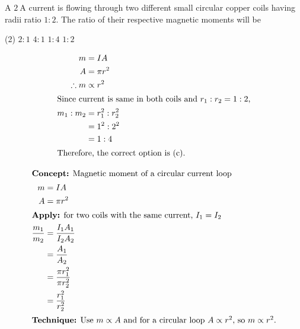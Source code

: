 

\item A $2 \ \mathrm{A}$ current is flowing through two different small circular copper coils having radii ratio $1 : 2$. The ratio of their respective magnetic moments will be
\begin{tasks}(2)
    \task $2 : 1$
    \task $4 : 1$
    \task $1 : 4$ \ans
    \task $1 : 2$
\end{tasks}
\begin{solution}
    \begin{align*}
    m &= I A\\
    A &= \pi r^2\\
    \therefore m &\propto r^2\\
    \intertext{Since current is same in both coils and $r_1 : r_2 = 1 : 2$,}
    m_1 : m_2 &= r_1^2 : r_2^2\\
    &= 1^2 : 2^2\\
    &= 1 : 4\\
    \intertext{Therefore, the correct option is (c).}
    \end{align*}
\end{solution}

\begin{idea}
    \begin{align*}
    \intertext{\textbf{Concept:} Magnetic moment of a circular current loop}
    m &= IA \\
    A &= \pi r^2 \\
    \intertext{\textbf{Apply:} for two coils with the same current, $I_1=I_2$}
    \frac{m_1}{m_2} &= \frac{I_1A_1}{I_2A_2} \\
    &= \frac{A_1}{A_2} \\
    &= \frac{\pi r_1^2}{\pi r_2^2} \\
    &= \frac{r_1^2}{r_2^2} \\
    \intertext{\textbf{Technique:} Use $m \propto A$ and for a circular loop $A \propto r^2$, so $m \propto r^2$.}
    \end{align*}
\end{idea}

